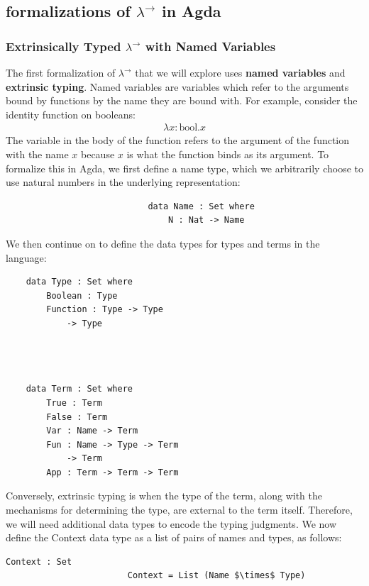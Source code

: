 \documentclass[12pt, letterpaper]{article}
\begin{document}
\subsection{formalizations of $\lambda^{\to}$ in Agda}

\subsubsection{Extrinsically Typed $\lambda^{\to}$ with Named Variables}

The first formalization of $\lambda^{\to}$ that we will explore uses \textbf{named variables} and \textbf{extrinsic typing}. Named variables are variables which refer to the arguments bound by functions by the name they are bound with. For example, consider the identity function on booleans:
\begin{align*}
\lambda x : \text{bool} . x
\end{align*}
The variable in the body of the function refers to the argument of the function with the name $x$ because $x$ is what the function binds as its argument. To formalize this in Agda, we first define a name type, which we arbitrarily choose to use natural numbers in the underlying representation:
\begin{Verbatim}
							data Name : Set where
								N : Nat -> Name
\end{Verbatim}
We then continue on to define the data types for types and terms in the language:
\begin{multicols}{2}
\begin{Verbatim}
	data Type : Set where
		Boolean : Type
		Function : Type -> Type 
			-> Type
		
		
		
\end{Verbatim}
\begin{Verbatim}
	data Term : Set where
		True : Term
		False : Term
		Var : Name -> Term
		Fun : Name -> Type -> Term 
			-> Term
		App : Term -> Term -> Term
\end{Verbatim}
\end{multicols}
Conversely, extrinsic typing is when the type of the term, along with the mechanisms for determining the type, are external to the term itself. Therefore, we will need additional data types to encode the typing judgments. We now define the Context data type as a list of pairs of names and types, as follows:
\begin{Verbatim}[mathescape,commandchars=\\\{\}]
						Context : Set
						Context = List (Name $\times$ Type)
\end{Verbatim}
\end{document}
